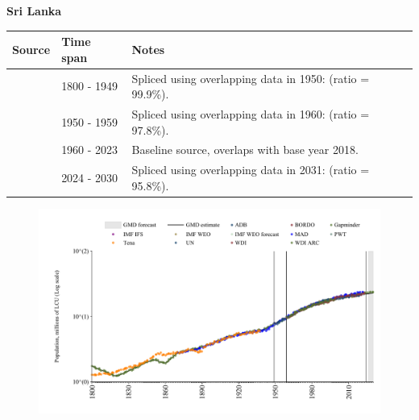 \documentclass[12pt,a4paper,landscape]{article}
\begin{document}
\begin{adjustbox}{max totalsize={\paperwidth}{\paperheight},center}
\begin{minipage}[t][\textheight][t]{\textwidth}
\vspace*{0.5cm}
{}
\begin{center}
{\Large\bfseries Sri Lanka}
\end{center}
\vspace{0.5cm}
\begin{table}[H]
\centering
\small
\begin{tabular}{|l|l|l|}
\hline
\textbf{Source} & \textbf{Time span} & \textbf{Notes} \\
\hline
\rowcolor{white}\cite{Gapminder}& 1800 - 1949 &Spliced using overlapping data in 1950: (ratio = 99.9\%).\\
\rowcolor{lightgray}\cite{IMF_IFS}& 1950 - 1959 &Spliced using overlapping data in 1960: (ratio = 97.8\%).\\
\rowcolor{white}\cite{WDI}& 1960 - 2023 &Baseline source, overlaps with base year 2018.\\
\rowcolor{lightgray}\cite{Gapminder}& 2024 - 2030 &Spliced using overlapping data in 2031: (ratio = 95.8\%).\\
\hline
\end{tabular}
\end{table}
\begin{figure}[H]
\centering
\includegraphics[width=\textwidth,height=0.6\textheight,keepaspectratio]{graphs/LKA_pop.pdf}
\end{figure}
\end{minipage}
\end{adjustbox}
\end{document}

